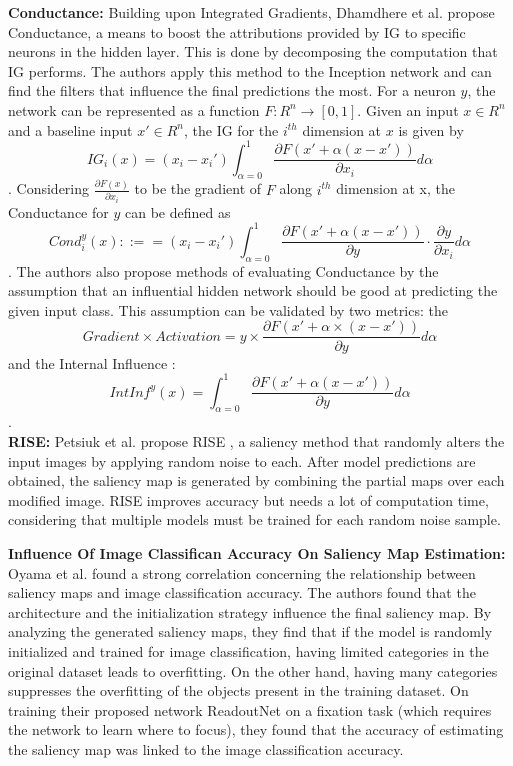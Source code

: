\documentclass[a4paper,11pt,openright]{book}
\begin{document}
\textbf{Conductance: }
Building upon Integrated Gradients, Dhamdhere et al. propose \cite{dhamdhereHowImportantNeuron2018} Conductance, a means to boost the attributions provided by IG to specific neurons in the hidden layer. This is done by decomposing the computation that IG performs. The authors apply this method to the Inception network \cite{szegedyGoingDeeperConvolutions2014} and can find the filters that influence the final predictions the most. 
For a neuron $y$, the network can be represented as a function $F: R^{n} \rightarrow [0,1]$. Given an input $x \in R^{n}$ and a baseline input $x' \in R^{n}$, the IG for the $i^{th}$ dimension at $x$ is given by $$IG_{i}(x) = (x_{i}- x_{i}') \int_{\alpha=0}^{1} \frac{\partial F(x' + \alpha(x-x'))}{\partial x_{i}}d \alpha$$ . Considering $\frac{\partial F(x)}{\partial x_{i}}$ to be the gradient of $F$ along $i^{th}$ dimension at x, the Conductance for $y$ can be defined as $$
Cond_{i}^{y}(x) ::== (x_{i}- x_{i}') \int_{\alpha=0}^{1} \frac{\partial F(x' + \alpha(x-x'))}{\partial y} \cdot \frac{\partial y}{\partial x_{i}} d \alpha$$. The authors also propose methods of evaluating Conductance by the assumption that an influential hidden network should be good at predicting the given input class. This assumption can be validated by two metrics: the $$Gradient\times Activation = 
y \times \frac{\partial F(x' + \alpha \times (x-x'))}{\partial y} d \alpha$$ and the Internal Influence : $$
IntInf ^{y}(x) = \int^{1}_{\alpha=0} \frac{\partial F(x' + \alpha(x-x'))}{\partial y} d \alpha$$.\\
\textbf{RISE: }
Petsiuk et al. propose RISE \cite{petsiukRISERandomizedInput2018}, a saliency method that randomly alters the input images by applying random noise to each. After model predictions are obtained, the saliency map is generated by combining the partial maps over each modified image. RISE improves accuracy but needs a lot of computation time, considering that multiple models must be trained for each random noise sample.

\textbf{Influence Of Image Classifican Accuracy On Saliency Map Estimation: }
Oyama et al. \cite{oyamaInfluenceImageClassification2018} found a strong correlation concerning the relationship between saliency maps and image classification accuracy. The authors found that the architecture and the initialization strategy influence the final saliency map. By analyzing the generated saliency maps, they find that if the model is randomly initialized and trained for image classification, having limited categories in the original dataset leads to overfitting. On the other hand, having many categories suppresses the overfitting of the objects present in the training dataset. On training their proposed network ReadoutNet on a fixation task (which requires the network to learn where to focus), they found that the accuracy of estimating the saliency map was linked to the image classification accuracy.
\end{document}
